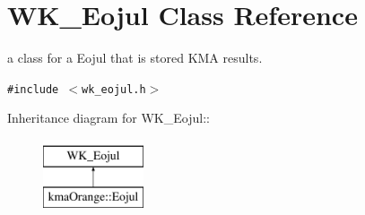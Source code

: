 \hypertarget{classWK__Eojul}{
\section{WK\_\-Eojul Class Reference}
\label{classWK__Eojul}
}
a class for a Eojul that is stored KMA results.  


{\tt \#include $<$wk\_\-eojul.h$>$}

Inheritance diagram for WK\_\-Eojul::\begin{figure}[H]
\begin{center}
\leavevmode
\includegraphics[height=2cm]{classWK__Eojul}
\end{center}
\end{figure}
